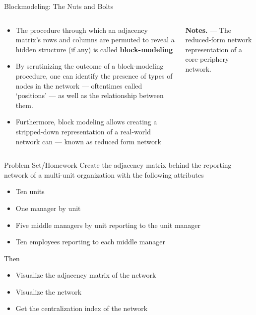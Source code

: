 \documentclass[show notes, aspectratio=1610]{beamer}
\begin{document}
\begin{frame}{Blockmodeling: The Nuts and Bolts}{}
	\begin{columns}
		\small 
		\begin{column}{0.5\textwidth}
			\begin{itemize}
				\item 
				The procedure through which an adjacency matrix's rows and
				columns are permuted to reveal a hidden structure (if
				any) is called \textbf{block-modeling} \cite{peixoto2014}
				\item 
				By scrutinizing the outcome of a block-modeling procedure,
				one can identify the presence of types of nodes 
				in the network --- oftentimes called `positions' --- 
				as well as the relationship between them.
				\item 
				Furthermore, block modeling allows creating 
				a stripped-down representation of a real-world network can 
				--- known as reduced form network
			\end{itemize}		
		\end{column}
		\begin{column}{0.5\textwidth}
			\centering

		\textbf{Notes.} --- The reduced-form network representation of a core-periphery 
		network.
		\end{column}
	\end{columns}
\end{frame}

\begin{frame}{Problem Set/Homework}{}
	Create the adjacency matrix behind the reporting network of a 
	multi-unit organization with the following attributes
	\begin{itemize}
		\item Ten units
		\item One manager by unit
		\item Five middle managers by unit reporting to the unit manager
		\item Ten employees reporting to each middle manager 
	\end{itemize}

	Then
	\begin{itemize}
		\item 
		Visualize the adjacency matrix of the network
		\item 
		Visualize the network
		\item 
		Get the centralization index of the network
	\end{itemize}
\end{frame}
\end{document}
